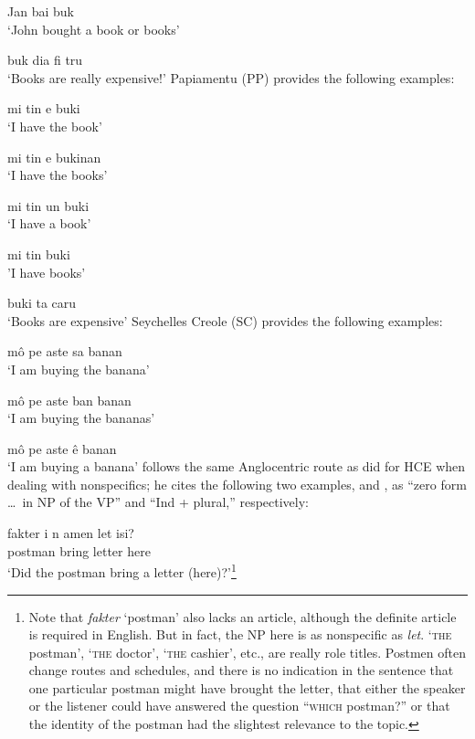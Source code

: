 \ea\label{ex:2:15}
Jan bai buk\\
\glt `John bought a book or books'
\z

\ea\label{ex:2:16}
 buk dia fi tru\\
\glt `Books are really expensive!'
\z
Papiamentu (PP) provides the following examples:

\ea\label{ex:2:17}
mi tin e buki\\
\glt `I have the book'
\z

\ea\label{ex:2:18}
mi tin e bukinan \\
\glt `I have the books'
\z

\ea\label{ex:2:19}
mi tin un buki\\
\glt `I have a book'
\z

\ea\label{ex:2:20}
mi tin buki\\
\glt  'I have books'
\z

\ea\label{ex:2:21}
buki ta caru \\
\glt `Books are expensive'
\z
Seychelles Creole (SC) provides the following examples:

\ea\label{ex:2:22}
 m\^o pe aste sa banan \\
\glt `I am buying the banana'
\z

\ea\label{ex:2:23}
m\^o pe aste ban banan\\
\glt `I am buying the bananas'
\z

\ea\label{ex:2:24}
 m\^o pe aste \^e banan\\
\glt `I am buying a banana'
\z
\citet[13]{Corne1977} follows the same Anglocentric route as \citet{Perlman1973} did for HCE when dealing with nonspecifics; he cites the following two examples,  and , as ``zero form \ldots~in NP of the VP'' and ``Ind + plural,'' respectively:

\ea\label{ex:2:25}
\gll fakter i n amen let isi?\\
postman {\PM} {\COMP} bring letter here\\
\glt `Did the postman bring a letter (here)?'\footnote{Note that \textit{fakter} `postman' also lacks an article, although the definite article is required in English. But in fact, the NP here is as nonspecific as \textit{let}. `\textsc{the} postman', `\textsc{the} doctor', `\textsc{the} cashier', etc., are really role titles. Postmen often change routes and schedules, and there is no indication in the sentence that one particular postman might have brought the letter, that either the speaker or the listener could have answered the question ``\textsc{which} postman?'' or that the identity of the postman had the slightest relevance to the topic.}
\z

